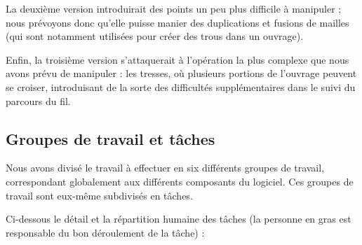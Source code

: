 \documentclass{article}
\begin{document}
La deuxième version introduirait des points un peu plus difficile à manipuler ; nous prévoyons donc qu'elle puisse manier des duplications et
fusions de mailles (qui sont notamment utilisées pour créer des trous dans un ouvrage).

Enfin, la troisième version s'attaquerait à l'opération la plus complexe que nous avons prévu de manipuler : les tresses, où plusieurs portions
de l'ouvrage peuvent se croiser, introduisant de la sorte des difficultés supplémentaires dans le suivi du parcours du fil.

\subsection{Groupes de travail et tâches\label{workpackages}}

Nous avons divisé le travail à effectuer en six différents groupes de travail, correspondant globalement aux différents composants du
logiciel. Ces groupes de travail sont eux-même subdivisés en tâches.

Ci-dessous le détail et la répartition humaine des tâches (la personne en gras est responsable du bon déroulement de la tâche) : \newline
\end{document}
